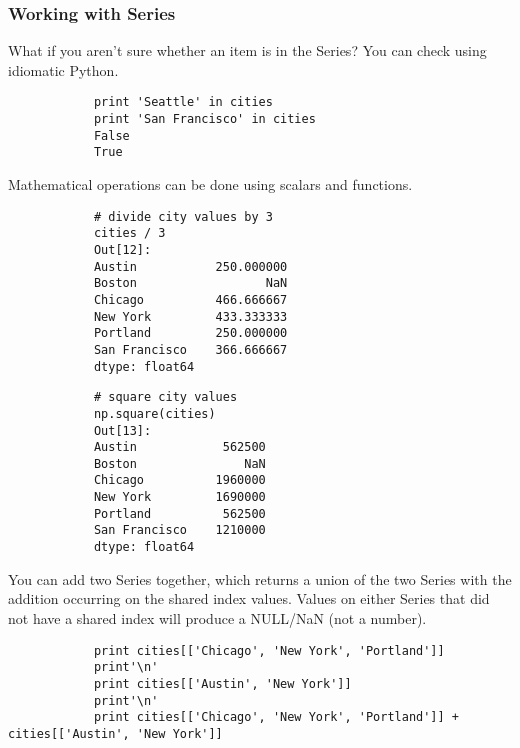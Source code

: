 \documentclass[MASTER.tex]{subfiles}
\begin{document}
	\begin{frame}[fragile]
		\frametitle{Working with Series}
		What if you aren't sure whether an item is in the Series? You can check using idiomatic Python.
		
		\begin{framed}
			\begin{verbatim}
			print 'Seattle' in cities
			print 'San Francisco' in cities
			False
			True
			\end{verbatim}
		\end{framed}
	\end{frame}
	\begin{frame}[fragile]
		Mathematical operations can be done using scalars and functions.
		
		\begin{framed}
			\begin{verbatim}
			# divide city values by 3
			cities / 3
			Out[12]:
			Austin           250.000000
			Boston                  NaN
			Chicago          466.666667
			New York         433.333333
			Portland         250.000000
			San Francisco    366.666667
			dtype: float64
		\end{verbatim}
	\end{framed}
\end{frame}
			\begin{frame}[fragile]
			\begin{framed}
			\begin{verbatim}
			# square city values
			np.square(cities)
			Out[13]:
			Austin            562500
			Boston               NaN
			Chicago          1960000
			New York         1690000
			Portland          562500
			San Francisco    1210000
			dtype: float64
			\end{verbatim}
		\end{framed}
	\end{frame}
	\begin{frame}[fragile]
		
		You can add two Series together, which returns a union of the two Series with the addition occurring on the shared index values. Values on either Series that did not have a shared index will produce a NULL/NaN (not a number).
		
		\begin{framed}
			\begin{verbatim}
			print cities[['Chicago', 'New York', 'Portland']]
			print'\n'
			print cities[['Austin', 'New York']]
			print'\n'
			print cities[['Chicago', 'New York', 'Portland']] + cities[['Austin', 'New York']]
			\end{verbatim}
		\end{framed}
			\end{frame}
\end{document}
